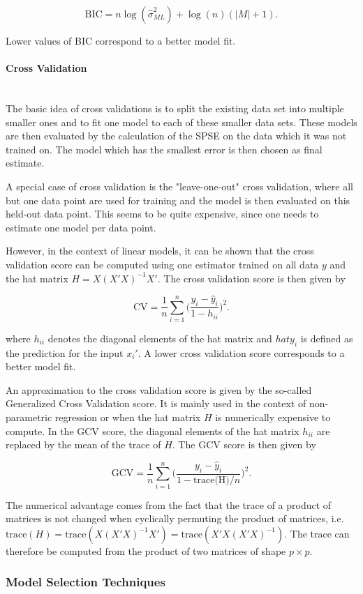 \documentclass[10pt,a4paper]{article}
\newcommand{\subsubsubsection}[1]{\paragraph{#1}\mbox{}\\}
\begin{document}
$$\text{BIC} = n\log(\hat \sigma_{ML}^2) + \log(n)(\vert M\vert + 1).$$

Lower values of BIC correspond to a better model fit.

\subsubsubsection{Cross Validation}

The basic idea of cross validations is to split the existing data set into multiple smaller ones and to fit one model to each of these smaller data sets. These models are then evaluated by the calculation of the SPSE on the data which it was not trained on. The model which has the smallest error is then chosen as final estimate. 

A special case of cross validation is the "leave-one-out" cross validation, where all but one data point are used for training and the model is then evaluated on this held-out data point. This seems to be quite expensive, since one needs to estimate one model per data point. 

However, in the context of linear models, it can be shown that the cross validation score can be computed using one estimator trained on all data $y$ and the hat matrix $H = X(X'X)^{-1}X'$. The cross validation score is then given by

$$\text{CV} = \frac{1}{n} \sum_{i=1}^n\big( \frac{y_i - \hat y_i}{1 - h_{ii}}\big)^2.$$

where $h_{ii}$ denotes the diagonal elements of the hat matrix and $hat y_i$ is defined as the prediction for the input $x_i'$. A lower cross validation score corresponds to a better model fit. \cite{golub1979}

An approximation to the cross validation score is given by the so-called Generalized Cross Validation score. It is mainly used in the context of non-parametric regression or when the hat matrix $H$ is numerically expensive to compute. In the GCV score, the diagonal elements of the hat matrix $h_{ii}$ are replaced by the mean of the trace of $H$. The GCV score is then given by

$$\text{GCV} = \frac{1}{n}\sum_{i=1}^n \Big( \frac{y_i - \hat y_i}{1 - \text{trace(H)}/n}\Big)^2.$$

The numerical advantage comes from the fact that the trace of a product of matrices is not changed when cyclically permuting the product of matrices, i.e. $\text{trace}(H) = \text{trace}(X(X'X)^{-1}X') = \text{trace}(X'X(X'X)^{-1})$. The trace can therefore be computed from the product of two matrices of shape $p\times p$. \cite{fahrmeir2013regression}

\subsubsection{Model Selection Techniques}
\end{document}
